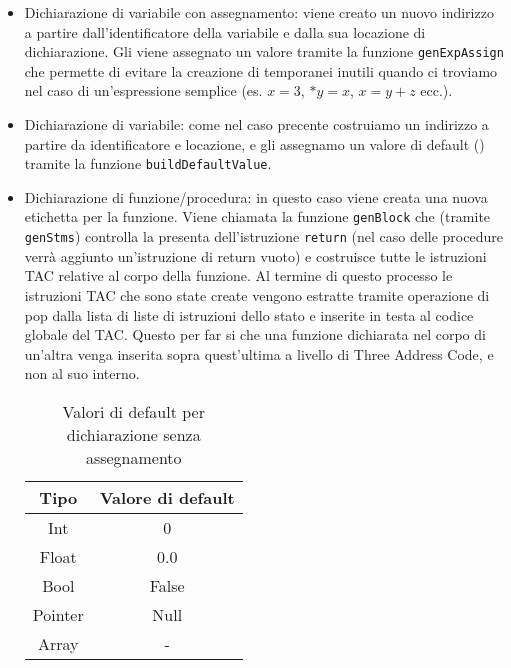 \begin{itemize}
    \item Dichiarazione di variabile con assegnamento: viene creato un nuovo indirizzo a partire dall'identificatore della variabile e dalla sua locazione di dichiarazione. Gli viene assegnato un valore tramite la funzione {\tt genExpAssign} che permette di evitare la creazione di temporanei inutili quando ci troviamo nel caso di un'espressione semplice (es. $x = 3$, $*y= x$, $x = y + z$ ecc.).
    \item Dichiarazione di variabile: come nel caso precente costruiamo un indirizzo a partire da identificatore e locazione, e gli assegnamo un valore di default (\label{table:valori_default}) tramite la funzione {\tt buildDefaultValue}.
    \item Dichiarazione di funzione/procedura: in questo caso viene creata una nuova etichetta per la funzione. Viene chiamata la funzione {\tt genBlock} che (tramite {\tt genStms}) controlla la presenta dell'istruzione {\tt return} (nel caso delle procedure verrà aggiunto un'istruzione di return vuoto) e costruisce tutte le istruzioni TAC relative al corpo della funzione. Al termine di questo processo le istruzioni TAC che sono state create vengono estratte tramite operazione di pop dalla lista di liste di istruzioni dello stato e inserite in testa al codice globale del TAC. Questo per far si che una funzione dichiarata nel corpo di un'altra venga inserita sopra quest'ultima a livello di Three Address Code, e non al suo interno.

\begin{table}
\centering
    \begin{tabular}{|c c|} 
        \hline
        Tipo & Valore di default \\ [0.5ex] 
        \hline\hline
        Int & 0 \\ 
        Float & 0.0  \\
        Bool & False \\ 
        Pointer & Null\\
        Array & - \\[1ex] 
        \hline
    \end{tabular}
    \caption{Valori di default per dichiarazione senza assegnamento}
    \label{table:valori_default}
\end{table}



\end{itemize}
